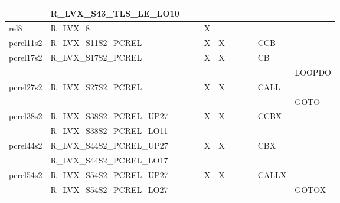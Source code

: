 {\begin{tabular}{|l|l|l|l|l|l|l|l|l|l|l|}
 & \textsf{R\_LVX\_S43\_TLS\_LE\_LO10} & & & & & & & & & \\
\hline
\textsf{rel8} & \textsf{R\_LVX\_8} & \textsf{} & \textsf{} & \textsf{X} & \textsf{} & \textsf{} & \textsf{} & \textsf{} & \textsf{} \\
\hline
\textsf{pcrel11s2} & \textsf{R\_LVX\_S11S2\_PCREL} & \textsf{} & \textsf{} & \textsf{X} & \textsf{X} & \textsf{} & \textsf{} & \textsf{} & \textsf{CCB} \\
\hline
\textsf{pcrel17s2} & \textsf{R\_LVX\_S17S2\_PCREL} & \textsf{} & \textsf{} & \textsf{X} & \textsf{X} & \textsf{} & \textsf{} & \textsf{} & \textsf{CB} \\
 & & & & & & & & & & \textsf{LOOPDO} \\
\hline
\textsf{pcrel27s2} & \textsf{R\_LVX\_S27S2\_PCREL} & \textsf{} & \textsf{} & \textsf{X} & \textsf{X} & \textsf{} & \textsf{} & \textsf{} & \textsf{CALL} \\
 & & & & & & & & & & \textsf{GOTO} \\
\hline
\textsf{pcrel38s2} & \textsf{R\_LVX\_S38S2\_PCREL\_UP27} & \textsf{} & \textsf{} & \textsf{X} & \textsf{X} & \textsf{} & \textsf{} & \textsf{} & \textsf{CCBX} \\
 & \textsf{R\_LVX\_S38S2\_PCREL\_LO11} & & & & & & & & & \\
\hline
\textsf{pcrel44s2} & \textsf{R\_LVX\_S44S2\_PCREL\_UP27} & \textsf{} & \textsf{} & \textsf{X} & \textsf{X} & \textsf{} & \textsf{} & \textsf{} & \textsf{CBX} \\
 & \textsf{R\_LVX\_S44S2\_PCREL\_LO17} & & & & & & & & & \\
\hline
\textsf{pcrel54s2} & \textsf{R\_LVX\_S54S2\_PCREL\_UP27} & \textsf{} & \textsf{} & \textsf{X} & \textsf{X} & \textsf{} & \textsf{} & \textsf{} & \textsf{CALLX} \\
 & \textsf{R\_LVX\_S54S2\_PCREL\_LO27} & & & & & & & & & \textsf{GOTOX} \\
\hline
\end{tabular}
}

